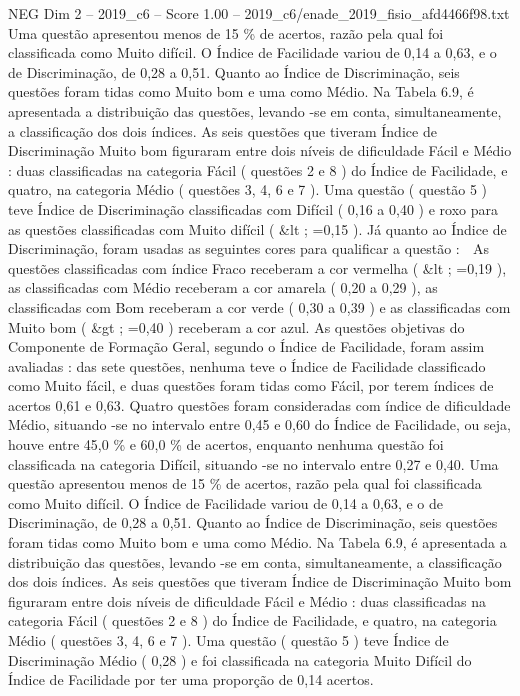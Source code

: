 \begin{textsample}{NEG Dim 2 – 2019\_c6 – Score 1.00 – 2019\_c6/enade\_2019\_fisio\_afd4466f98.txt}
Uma questão apresentou menos de 15 \% de acertos, razão pela qual foi classificada como Muito difícil.
O Índice de Facilidade variou de 0,14 a 0,63, e o de Discriminação, de 0,28 a 0,51.
Quanto ao Índice de Discriminação, seis questões foram tidas como Muito bom e uma como Médio.
Na Tabela 6.9, é apresentada a distribuição das questões, levando -se em conta, simultaneamente, a classificação dos dois índices.
As seis questões que tiveram Índice de Discriminação Muito bom figuraram entre dois níveis de dificuldade Fácil e Médio : duas classificadas na categoria Fácil ( questões 2 e 8 ) do Índice de Facilidade, e quatro, na categoria Médio ( questões 3, 4, 6 e 7 ).
Uma questão ( questão 5 ) teve Índice de Discriminação classificadas com Difícil ( 0,16 a 0,40 ) e roxo para as questões classificadas com Muito difícil ( \&lt ; =0,15 ).
Já quanto ao Índice de Discriminação, foram usadas as seguintes cores para qualificar a questão :  As questões classificadas com índice Fraco receberam a cor vermelha ( \&lt ; =0,19 ), as classificadas com Médio receberam a cor amarela ( 0,20 a 0,29 ), as classificadas com Bom receberam a cor verde ( 0,30 a 0,39 ) e as classificadas com Muito bom ( \&gt ; =0,40 ) receberam a cor azul.
As questões objetivas do Componente de Formação Geral, segundo o Índice de Facilidade, foram assim avaliadas : das sete questões, nenhuma teve o Índice de Facilidade classificado como Muito fácil, e duas questões foram tidas como Fácil, por terem índices de acertos 0,61 e 0,63.
Quatro questões foram consideradas com índice de dificuldade Médio, situando -se no intervalo entre 0,45 e 0,60 do Índice de Facilidade, ou seja, houve entre 45,0 \% e 60,0 \% de acertos, enquanto nenhuma questão foi classificada na categoria Difícil, situando -se no intervalo entre 0,27 e 0,40.
Uma questão apresentou menos de 15 \% de acertos, razão pela qual foi classificada como Muito difícil.
O Índice de Facilidade variou de 0,14 a 0,63, e o de Discriminação, de 0,28 a 0,51.
Quanto ao Índice de Discriminação, seis questões foram tidas como Muito bom e uma como Médio.
Na Tabela 6.9, é apresentada a distribuição das questões, levando -se em conta, simultaneamente, a classificação dos dois índices.
As seis questões que tiveram Índice de Discriminação Muito bom figuraram entre dois níveis de dificuldade Fácil e Médio : duas classificadas na categoria Fácil ( questões 2 e 8 ) do Índice de Facilidade, e quatro, na categoria Médio ( questões 3, 4, 6 e 7 ).
Uma questão ( questão 5 ) teve Índice de Discriminação Médio ( 0,28 ) e foi classificada na categoria Muito Difícil do Índice de Facilidade por ter uma proporção de 0,14 acertos.

\end{textsample}
